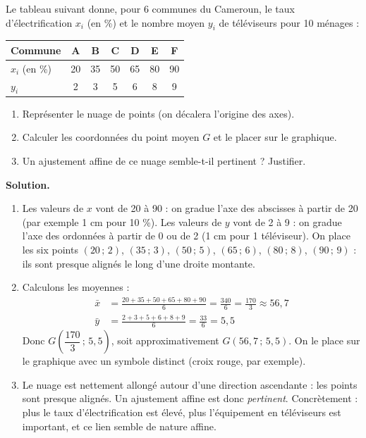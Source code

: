 \documentclass[11pt]{article}
\begin{document}
\begin{exoresolu}
Le tableau suivant donne, pour 6 communes du Cameroun, le taux d'électrification $x_i$ (en \%) et le nombre moyen $y_i$ de téléviseurs pour 10 ménages :
\begin{center}
\begin{tabular}{|l|c|c|c|c|c|c|}
\hline
\rowcolor{popblueL} Commune & A & B & C & D & E & F \\
\hline
$x_i$ (en \%) & 20 & 35 & 50 & 65 & 80 & 90 \\
\hline
$y_i$ & 2 & 3 & 5 & 6 & 8 & 9 \\
\hline
\end{tabular}
\end{center}
\begin{enumerate}
\item Représenter le nuage de points (on décalera l'origine des axes).
\item Calculer les coordonnées du point moyen $G$ et le placer sur le graphique.
\item Un ajustement affine de ce nuage semble-t-il pertinent ? Justifier.
\end{enumerate}
\tcblower
\textbf{Solution.}
\begin{enumerate}
\item Les valeurs de $x$ vont de 20 à 90 : on gradue l'axe des abscisses à partir de 20 (par exemple 1 cm pour 10 \%). Les valeurs de $y$ vont de 2 à 9 : on gradue l'axe des ordonnées à partir de 0 ou de 2 (1 cm pour 1 téléviseur). On place les six points $(20\,;\,2)$, $(35\,;\,3)$, $(50\,;\,5)$, $(65\,;\,6)$, $(80\,;\,8)$, $(90\,;\,9)$ : ils sont presque alignés le long d'une droite montante.
\item Calculons les moyennes :
\begin{align*}
\bar{x} &= \frac{20+35+50+65+80+90}{6} = \frac{340}{6} = \frac{170}{3} \approx 56{,}7 \\
\bar{y} &= \frac{2+3+5+6+8+9}{6} = \frac{33}{6} = 5{,}5
\end{align*}
Donc $G\left(\dfrac{170}{3}\,;\,5{,}5\right)$, soit approximativement $G(56{,}7\,;\,5{,}5)$. On le place sur le graphique avec un symbole distinct (croix rouge, par exemple).
\item Le nuage est nettement allongé autour d'une direction ascendante : les points sont presque alignés. Un ajustement affine est donc \emph{pertinent}. Concrètement : plus le taux d'électrification est élevé, plus l'équipement en téléviseurs est important, et ce lien semble de nature affine.
\end{enumerate}
\end{exoresolu}
\end{document}
